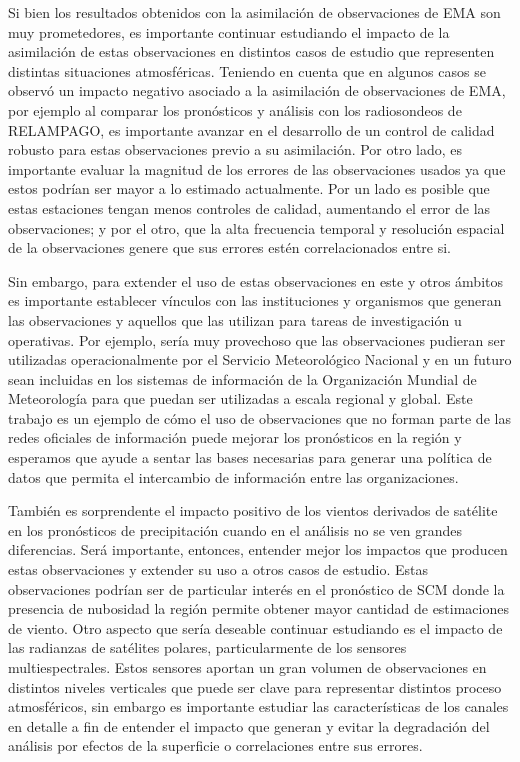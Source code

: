 \documentclass[12pt,oneside,a4paper]{reedthesis}
\begin{document}
Si bien los resultados obtenidos con la asimilación de observaciones de EMA son muy prometedores, es importante continuar estudiando el impacto de la asimilación de estas observaciones en distintos casos de estudio que representen distintas situaciones atmosféricas. Teniendo en cuenta que en algunos casos se observó un impacto negativo asociado a la asimilación de observaciones de EMA, por ejemplo al comparar los pronósticos y análisis con los radiosondeos de RELAMPAGO, es importante avanzar en el desarrollo de un control de calidad robusto para estas observaciones previo a su asimilación. Por otro lado, es importante evaluar la magnitud de los errores de las observaciones usados ya que estos podrían ser mayor a lo estimado actualmente. Por un lado es posible que estas estaciones tengan menos controles de calidad, aumentando el error de las observaciones; y por el otro, que la alta frecuencia temporal y resolución espacial de la observaciones genere que sus errores estén correlacionados entre si.

Sin embargo, para extender el uso de estas observaciones en este y otros ámbitos es importante establecer vínculos con las instituciones y organismos que generan las observaciones y aquellos que las utilizan para tareas de investigación u operativas. Por ejemplo, sería muy provechoso que las observaciones pudieran ser utilizadas operacionalmente por el Servicio Meteorológico Nacional y en un futuro sean incluidas en los sistemas de información de la Organización Mundial de Meteorología para que puedan ser utilizadas a escala regional y global. Este trabajo es un ejemplo de cómo el uso de observaciones que no forman parte de las redes oficiales de información puede mejorar los pronósticos en la región y esperamos que ayude a sentar las bases necesarias para generar una política de datos que permita el intercambio de información entre las organizaciones.

También es sorprendente el impacto positivo de los vientos derivados de satélite en los pronósticos de precipitación cuando en el análisis no se ven grandes diferencias. Será importante, entonces, entender mejor los impactos que producen estas observaciones y extender su uso a otros casos de estudio. Estas observaciones podrían ser de particular interés en el pronóstico de SCM donde la presencia de nubosidad la región permite obtener mayor cantidad de estimaciones de viento. Otro aspecto que sería deseable continuar estudiando es el impacto de las radianzas de satélites polares, particularmente de los sensores multiespectrales. Estos sensores aportan un gran volumen de observaciones en distintos niveles verticales que puede ser clave para representar distintos proceso atmosféricos, sin embargo es importante estudiar las características de los canales en detalle a fin de entender el impacto que generan y evitar la degradación del análisis por efectos de la superficie o correlaciones entre sus errores.
\end{document}

